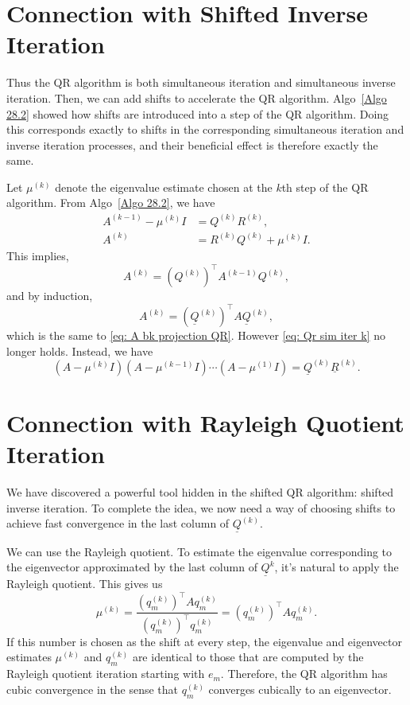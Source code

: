 \section{Connection with Shifted Inverse Iteration} 
Thus the QR algorithm is both simultaneous iteration and simultaneous inverse iteration.  Then, we can add shifts to accelerate the QR algorithm.  Algo~\ref{Algo 28.2} showed how shifts are introduced into a step of the QR algorithm. Doing this corresponds exactly to shifts in the corresponding simultaneous iteration and inverse iteration processes, and their beneficial effect is therefore exactly the same. 

Let $\mu^{(k)}$ denote the eigenvalue estimate chosen at the $k$th step of the QR algorithm. From Algo~\ref{Algo 28.2}, we have 
\begin{align*}
    A^{(k-1)} - \mu^{(k)}I &= Q^{(k)}R^{(k)}, \\ 
    A^{(k)} &= R^{(k)} Q^{(k)} + \mu^{(k)} I . 
\end{align*}
This implies, 
\[
    A^{(k)} = (Q^{(k)}) ^\top  A^{(k-1)}Q^{(k)}, 
\]
and by induction, 
\[
    A^{(k)} = (\underline{Q}^{(k)})^\top  A \underline{Q}^{(k)},
\]
which is the same to \eqref{eq: A bk projection QR}. However \eqref{eq: Qr sim iter k} no longer holds. Instead, we have 
\[
    (A-\mu^{(k)}I ) (A-\mu ^{(k-1)}I) \cdots (A-\mu^{(1)}I) = \underline{Q}^{(k)}\underline{R}^{(k)}.  
\]

\section{Connection with Rayleigh Quotient Iteration} 
We have discovered a powerful tool hidden in the shifted QR algorithm: shifted inverse iteration. To complete the idea, we now need a way of choosing shifts to achieve fast convergence in the last column of $ \underline{Q}^{(k)} $.  

We can use the Rayleigh quotient. To estimate the eigenvalue corresponding to the eigenvector approximated by the last column of $\underline{Q}^{k}$, it's natural to apply the Rayleigh quotient. This gives us 
\[
    \mu ^{(k)} = \frac{(q_m^{(k)})^\top A q_m^{(k)}}{(q_m^{(k)})^\top q_m^{(k)}} = (q_m^{(k)})^\top  A q_m^{(k)}. 
\]
If this number is chosen as the shift at every step, the eigenvalue and eigenvector estimates $ \mu^{(k)} $ and $ q_m^{(k)} $ are identical to those that are computed by the Rayleigh quotient iteration starting with $ e_m $.  Therefore, the QR algorithm has cubic convergence in the sense that $ q_m^{(k)} $ converges cubically to an eigenvector.  

